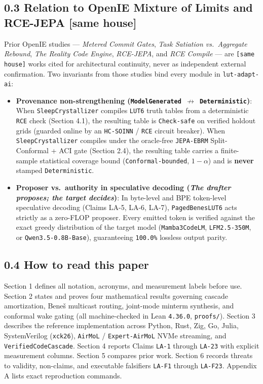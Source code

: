 \documentclass[10pt]{article}
\begin{document}
\subsection{0.3 Relation to OpenIE Mixture of Limits and RCE-JEPA [same house]}\label{same-house}

Prior OpenIE studies --- \emph{Metered Commit Gates}, \emph{Task Satiation vs.\ Aggregate Rebound}, \emph{The Reality Code Engine}, \emph{RCE-JEPA}, and \emph{RCE Compile} --- are \texttt{[same house]} works cited for architectural continuity, never as independent external confirmation. Two invariants from those studies bind every module in \texttt{lut-adapt-ai}:
\begin{itemize}
  \item \textbf{Provenance non-strengthening (\texttt{ModelGenerated $\nrightarrow$ Deterministic})}: When \texttt{SleepCrystallizer} compiles \texttt{LUT6} truth tables from a deterministic \texttt{RCE} check (Section 4.1), the resulting table is \texttt{Check-safe} on verified holdout grids (guarded online by an \texttt{HC-SOINN} / \texttt{RCE} circuit breaker). When \texttt{SleepCrystallizer} compiles under the oracle-free \texttt{JEPA-EBRM} Split-Conformal + ACI gate (Section 2.4), the resulting table carries a finite-sample statistical coverage bound (\texttt{Conformal-bounded}, $1-\alpha$) and is \textbf{never} stamped \texttt{Deterministic}.
  \item \textbf{Proposer vs.\ authority in speculative decoding (\emph{The drafter proposes; the target decides})}: In byte-level and BPE token-level speculative decoding (Claims LA-5, LA-6, LA-7), \texttt{PagedBenesLUT6} acts strictly as a zero-FLOP proposer. Every emitted token is verified against the exact greedy distribution of the target model (\texttt{Mamba3CodeLM}, \texttt{LFM2.5-350M}, or \texttt{Qwen3.5-0.8B-Base}), guaranteeing \texttt{100.0\%} lossless output parity.
\end{itemize}

\subsection{0.4 How to read this paper}\label{how-to-read}

Section 1 defines all notation, acronyms, and measurement labels before use. Section 2 states and proves four mathematical results governing cascade amortization, Bene\v{s} multicast routing, joint-mode minterm synthesis, and conformal wake gating (all machine-checked in Lean \texttt{4.36.0}, \texttt{proofs/}). Section 3 describes the reference implementation across Python, Rust, Zig, Go, Julia, SystemVerilog (\texttt{xck26}), \texttt{AirMoL} / \texttt{Expert-AirMoL} NVMe streaming, and \texttt{VerifiedCodeCascade}. Section 4 reports Claims \texttt{LA-1} through \texttt{LA-23} with explicit measurement columns. Section 5 compares prior work. Section 6 records threats to validity, non-claims, and executable falsifiers \texttt{LA-F1} through \texttt{LA-F23}. Appendix A lists exact reproduction commands.
\end{document}
